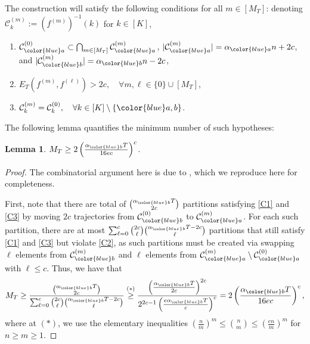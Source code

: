 \documentclass[twoside]{article}
\def\gC{{\mathcal{C}}}
\theoremstyle{plain}
\newtheorem{lemma}{Lemma}[section]
\begin{document}
The construction will satisfy the following conditions for all $m \in [M_T]$: denoting $\gC_k^{(m)} := (f^{(m)})^{-1}(k)$ for $k \in [K]$,
\begin{enumerate}[
    label=(\textbf{C\arabic*}), %
    ref=(\textbf{C\arabic*})     %
]
    \item $\gC_{\color{blue} a}^{(0)} \subset \bigcap_{m \in [M_T]} \gC_{\color{blue} a}^{(m)}$, $|\gC_{\color{blue} a}^{(m)}| = \alpha_{\color{blue} a} n + 2c$, and $|\gC_{\color{blue} b}^{(m)}| = \alpha_{\color{blue} b} n - 2c$, \label{C1}
    \item $E_T(f^{(m)}, f^{(\ell)}) > 2c, \quad \forall m, \ell \in \{0\} \cup [M_T]$, \label{C2}
    \item $\gC_{k}^{(m)} = \gC_{k}^{(0)}, \quad \forall k \in [K] \setminus \{{\color{blue} a, b}\}$. \label{C3}
\end{enumerate}
The following lemma quantifies the minimum number of such hypotheses:
\begin{lemma}
\label{lem:M}
    $M_T \geq 2 \left( \frac{\alpha_{\color{blue} b} T}{16 e c} \right)^c$.
\end{lemma}
\begin{proof}
    The combinatorial argument here is due to \citet[Appendix B]{yun2019optimal}, which we reproduce here for completeness.
    
    First, note that there are total of $\binom{\alpha_{\color{blue} b} T}{2c}$ partitions satisfying \ref{C1} and \ref{C3} by moving $2c$ trajectories from $\gC_{\color{blue} b}^{(0)}$ to $\gC_{\color{blue} a}^{(m)}$.
    For each such partition, there are at most $\sum_{\ell=0}^c \binom{2c}{\ell} \binom{\alpha_{\color{blue} b} T - 2c}{\ell}$ partitions that still satisfy \ref{C1} and \ref{C3} but violate \ref{C2}, as such partitions must be created via swapping $\ell$ elements from $\gC_{\color{blue} b}^{(m)}$ and $\ell$ elements from $\gC_{\color{blue} a}^{(m)} \setminus \gC_{\color{blue} a}^{(0)}$ with $\ell \leq c$.
    Thus, we have that
    \begin{equation*}
        M_T \geq \frac{\binom{\alpha_{\color{blue} b} T}{2c}}{\sum_{\ell=0}^c \binom{2c}{\ell} \binom{\alpha_{\color{blue} b}T - 2c}{\ell}}
        \overset{(*)}{\geq} \frac{\left( \frac{\alpha_{\color{blue} b} T}{2c} \right)^{2c}}{2^{2c-1} \left( \frac{e \alpha_{\color{blue} b} T}{c} \right)^c}
        = 2 \left( \frac{\alpha_{\color{blue} b} T}{16 e c} \right)^c,
    \end{equation*}
    where at $(*)$, we use the elementary inequalities $\left( \frac{n}{m} \right)^m \leq \binom{n}{m} \leq \left( \frac{e n}{m} \right)^m$ for $n \geq m \geq 1$.
\end{proof}
\end{document}
